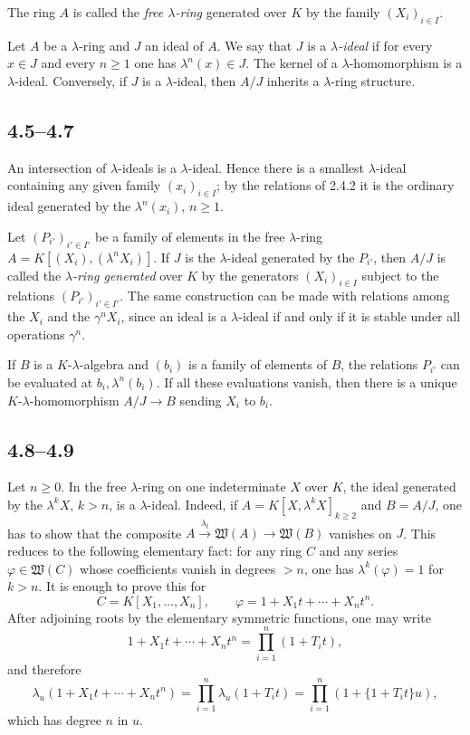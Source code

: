 \documentclass[13pt]{extarticle}
\begin{document}
The ring $A$ is called the \emph{free $\lambda$-ring} generated over $K$ by the family $(X_i)_{i\in I}$.

Let $A$ be a $\lambda$-ring and $J$ an ideal of $A$. We say that $J$ is a \emph{$\lambda$-ideal} if for every $x\in J$ and every $n\geq 1$ one has $\lambda^n(x)\in J$. The kernel of a $\lambda$-homomorphism is a $\lambda$-ideal. Conversely, if $J$ is a $\lambda$-ideal, then $A/J$ inherits a $\lambda$-ring structure.

\subsection*{4.5--4.7}
An intersection of $\lambda$-ideals is a $\lambda$-ideal. Hence there is a smallest $\lambda$-ideal containing any given family $(x_i)_{i\in I}$; by the relations of 2.4.2 it is the ordinary ideal generated by the $\lambda^n(x_i)$, $n\geq 1$.

Let $(P_{i'})_{i'\in I'}$ be a family of elements in the free $\lambda$-ring $A=K[(X_i),(\lambda^nX_i)]$. If $J$ is the $\lambda$-ideal generated by the $P_{i'}$, then $A/J$ is called the \emph{$\lambda$-ring generated} over $K$ by the generators $(X_i)_{i\in I}$ subject to the relations $(P_{i'})_{i'\in I'}$. The same construction can be made with relations among the $X_i$ and the $\gamma^nX_i$, since an ideal is a $\lambda$-ideal if and only if it is stable under all operations $\gamma^n$.

If $B$ is a $K$-$\lambda$-algebra and $(b_i)$ is a family of elements of $B$, the relations $P_{i'}$ can be evaluated at $b_i,\lambda^n(b_i)$. If all these evaluations vanish, then there is a unique $K$-$\lambda$-homomorphism $A/J\to B$ sending $X_i$ to $b_i$.

\subsection*{4.8--4.9}
Let $n\geq 0$. In the free $\lambda$-ring on one indeterminate $X$ over $K$, the ideal generated by the $\lambda^kX$, $k>n$, is a $\lambda$-ideal. Indeed, if $A=K[X,\lambda^kX]_{k\geq 2}$ and $B=A/J$, one has to show that the composite $A\xrightarrow{\lambda_t}\mathfrak W(A)\to\mathfrak W(B)$ vanishes on $J$. This reduces to the following elementary fact: for any ring $C$ and any series $\varphi\in\mathfrak W(C)$ whose coefficients vanish in degrees $>n$, one has $\lambda^k(\varphi)=1$ for $k>n$. It is enough to prove this for
\[
C=K[X_1,\ldots,X_n],
\qquad
\varphi=1+X_1t+\cdots+X_nt^n.
\]
After adjoining roots by the elementary symmetric functions, one may write
\[
1+X_1t+\cdots+X_nt^n=\prod_{i=1}^{n}(1+T_it),
\]
and therefore
\[
\lambda_u(1+X_1t+\cdots+X_nt^n)=\prod_{i=1}^{n}\lambda_u(1+T_it)=\prod_{i=1}^{n}(1+\{1+T_it\}u),
\]
which has degree $n$ in $u$.
\end{document}
